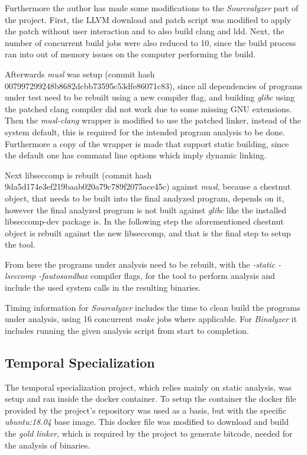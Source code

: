 Furthermore the author has made some modifications to the \textit{Sourcealyzer} part of the project. First, the LLVM download and patch script was modified to apply the patch without user interaction and to also build clang and ldd.
Next, the number of concurrent build jobs were also reduced to 10, since the build process ran into out of memory issues on the computer performing the build.

Afterwards \textit{musl} was setup (commit hash 007997299248b8682dcbb73595c53dfe86071c83), since all dependencies of programs under test need to be rebuilt using a new compiler flag, and building \textit{glibc} using the patched clang compiler did not work due to some missing GNU extensions.
Then the \textit{musl-clang} wrapper is modified to use the patched linker, instead of the system default, this is required for the intended program analysis to be done.
Furthermore a copy of the wrapper is made that support static building, since the default one has command line options which imply dynamic linking.

Next libseccomp is rebuilt (commit hash 9da5d174e3ef219baab020a79c789f2075ace45c) against \textit{musl}, because a chestnut object, that needs to be built into the final analyzed program, depends on it, however the final analyzed program is not built against \textit{glibc} like the installed libseccomp-dev package is.
In the following step the aforementioned chestnut object is rebuilt against the new libseccomp, and that is the final step to setup the tool.

From here the programs under analysis need to be rebuilt, with the \textit{-static -lseccomp -fautosandbox} compiler flags, for the tool to perform analysis and include the used system calls in the resulting binaries.

Timing information for \textit{Sourcalyzer} includes the time to clean build the programs under analysis, using 16 concurrent \textit{make} jobs where applicable. For \textit{Binalyzer} it includes running the given analysis script from start to completion.

\subsection {Temporal Specialization}
The temporal specialization \cite{ref_mp_1} project, which relies mainly on static analysis, was setup and ran inside the docker container.
To setup the container the docker file provided by the project's repository was used as a basis, but with the specific \textit{ubuntu:18.04} base image.
This docker file was modified to download and build the \textit{gold linker}, which is required by the project to generate bitcode, needed for the analysis of binaries.


